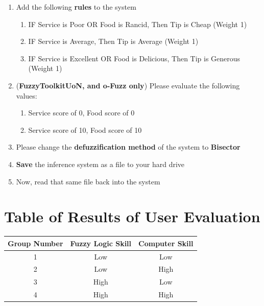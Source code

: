 \begin{enumerate}
\begin{enumerate}
\begin{tabular}{ll}
	\end{tabular}			
	\end{enumerate}	
\item Add the following \textbf{rules} to the system
	\begin{enumerate}
	\item IF Service is Poor OR Food is Rancid, Then Tip is Cheap (Weight 1)
	\item IF Service is Average, Then Tip is Average (Weight 1)
	\item IF Service is Excellent OR Food is Delicious, Then Tip is Generous (Weight 1)
	\end{enumerate}
\item (\textbf{FuzzyToolkitUoN, and o-Fuzz only}) Please evaluate the following values:
	\begin{enumerate}
	\item Service score of 0, Food score of 0
	\item Service score of 10, Food score of 10
	\end{enumerate}
\item Please change the \textbf{defuzzification method}	of the system to \textbf{Bisector}
\item \textbf{Save} the inference system as a file to your hard drive
\item Now, read that same file back into the system
\end{enumerate}

\newpage
\section{Table of Results of User Evaluation}
\label{app-torous}



\begin{center}
\begin{tabular}{ccc}
\hline
\textbf{Group Number} & \textbf{Fuzzy Logic Skill} & \textbf{Computer Skill} \\
\hline 
1	& Low  & Low  \\
2	& Low  & High \\
3	& High & Low  \\
4	& High & High \\
\end{tabular}
\end{center}

